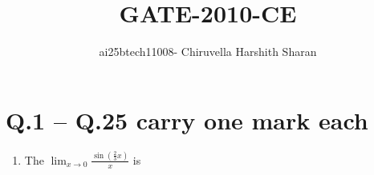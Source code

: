 \documentclass[journal,12pt,onecolumn]{IEEEtran}
\title{\huge {GATE-2010-CE}}
\author{ai25btech11008- Chiruvella Harshith Sharan}
\date{}
\theoremstyle{remark}
\begin{document}
\maketitle

\setlength{\parindent}{0pt}
\setlength{\parskip}{0.5cm}

\section*{Q.1 -- Q.25 carry one mark each}

\begin{enumerate}
\item The $\displaystyle \lim_{x \to 0} \frac{\sin \left( \frac{2}{3} x \right)}{x}$ is  
\hfill{}
\begin{enumerate}
   

\end{enumerate}
\end{enumerate}
\end{document}

